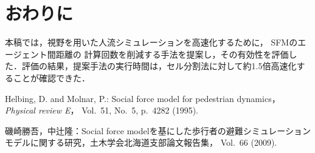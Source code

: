 \documentclass{maelab_y}
\newcommand{\分類条件}{
\begin{table}[t]
\begin{center}
\caption{進行方向を分類する条件}
\ecaption{Classification condition of moving direction $e_{i}$.}
\label{tb:hantei_jouken}
\begin{tabular}{c|c|c|c|c}
\hline \hline
			& 右 & 左 & 上 & 下 \\ \hline
パターン2   & $\frac{1}{\sqrt{2}} < e_x \leq 1  $
		    & $ -1 \leq e_x < \frac{-1}{\sqrt{2}}$ 
		    & $ \frac{-1}{\sqrt{2}} < e_x < \frac{1}{\sqrt{2}} $ 
		    & $ \frac{-1}{2} < e_x < \frac{1}{2} $ \\
パターン3   & $\frac{-1}{2} < e_y < \frac{1}{2} $ 
		    & $\frac{-1}{2} < e_y < \frac{1}{2} $
            & $ \frac{1}{\sqrt{2}} < e_y \leq 1$
		    & $ -1 \leq e_y < \frac{-1}{\sqrt{2}} $ \\
\hline
\multirow{2}{*}{パターン4}   
			& $R_x \geq A_x$ & $R_x < A_x$ & $R_y \geq A_y$ & $R_y < A_y $ \\
	        &  $L_x \geq A_x$ & $L_x < A_x$ & $L_y \geq A_y$ & $L_y < A_y$ \\
\hline
\multirow{2}{*}{パターン5}   
 			& $R_x \geq x_1$ & $R_x < x_2$ & $R_y \geq y_1$ & $R_y < y_2 $ \\
			& $L_x \geq x_1$ & $L_x < x_2$ & $L_y \geq y_1$ & $L_y < y_2 $ \\
\hline
パターン6   & $ \cos(\frac{1}{2}\theta_{view}) \leq  e_y $ 
			& $ e_y \leq -\cos(\frac{1}{2}\theta_{view})$ 
			& $ \sin(\frac{1}{2}(\pi - \theta_{view})) \leq e_x $ 
			& $ e_x \leq \sin(\frac{1}{2}(\pi - \theta_{view}))  $ \\
\hline
\end{tabular}
\end{center}
\end{table}}
\newcommand{\距離計算new}{
  \begin{table}[]
    \caption{エージェント間距離の計算回数[$10^{10}$回]}
    \label{tab:my-table}
    \begin{tabular}{c|llllll}
    \hline
    \multirow{2}{*}{人数}   & \multicolumn{6}{c}{パターン}                                                                                                                                                              \\ \cline{2-7} 
                          & \multicolumn{1}{c|}{1}    & \multicolumn{1}{c|}{2}               & \multicolumn{1}{c|}{3}      & \multicolumn{1}{c|}{4}      & \multicolumn{1}{c|}{5}      & \multicolumn{1}{c}{6}    \\ \hline
    \multirow{2}{*}{3000} & \multicolumn{1}{r|}{5.1}  & \multicolumn{1}{r|}{\textbf{3.9}}    & \multicolumn{1}{r|}{4.0}    & \multicolumn{1}{r|}{4.4}    & \multicolumn{1}{r|}{4.1}    & \multicolumn{1}{r}{4.4}  \\
                          & \multicolumn{1}{l|}{}     & \multicolumn{1}{l|}{\textbf{(24\%)}} & \multicolumn{1}{l|}{(23\%)} & \multicolumn{1}{l|}{(15\%)} & \multicolumn{1}{l|}{(21\%)} & (15\%)                   \\ \hline
    \multirow{2}{*}{5000} & \multicolumn{1}{r|}{14.4} & \multicolumn{1}{r|}{\textbf{10.9}}   & \multicolumn{1}{r|}{11.1}   & \multicolumn{1}{r|}{12.2}   & \multicolumn{1}{r|}{11.4}   & \multicolumn{1}{r}{12.2} \\
                          & \multicolumn{1}{l|}{}     & \multicolumn{1}{l|}{\textbf{(24\%)}} & \multicolumn{1}{l|}{(23\%)} & \multicolumn{1}{l|}{(15\%)} & \multicolumn{1}{l|}{(21\%)} & (15\%)                   \\ \hline
    \multirow{2}{*}{7500} & \multicolumn{1}{r|}{33.1} & \multicolumn{1}{r|}{\textbf{25.2}}   & \multicolumn{1}{r|}{25.8}   & \multicolumn{1}{r|}{28.3}   & \multicolumn{1}{r|}{26.7}   & \multicolumn{1}{r}{28.3} \\
                          & \multicolumn{1}{l|}{}     & \multicolumn{1}{l|}{\textbf{(24\%)}} & \multicolumn{1}{l|}{(22\%)} & \multicolumn{1}{l|}{(15\%)} & \multicolumn{1}{l|}{(20\%)} & (15\%)                   \\ \hline
    \end{tabular}
    \end{table}
}
\newcommand{\距離計算回数}{
\begin{table}[hbtp]
\begin{center}
\caption{エージェント間距離の計算回数[$10^{10}$回]}
\label{tb:count_result_yobi}
\begin{tabular}{c|r|r|r|r|r|r}
\hline \hline
	人数 & 1 & 2 & 3 & 4 & 5 & 6 \\  
	\hline
	\multirow{2}{*}{3000} 
	& 5.1   & $\mathbf{3.9}$   & 4.0    & 4.4    & 4.1    & 4.4   \\  
	&       & ($\mathbf{24.5}$\%) 					& (22.9\%) & (15.3\%) & (20.7\%) & (15.2\%) \\ \hline
	\multirow{2}{*}{5000} 
	& 14.4  &  $\mathbf{10.9}$  					  & 11.1   & 12.2   & 11.4   & 12.2  \\  
	&       & ($\mathbf{23.8}$\%) 					& (22.6\%) & (15.2\%) & (20.5\%) & (15.1\%) \\ \hline
	\multirow{2}{*}{7500} 
	& 33.1  & $\mathbf{25.2}$	 		    	 	 & 25.8   & 28.3   & 26.7   & 28.3  \\ 
	&       & ($\mathbf{23.9}$\%) 					& (22.2\%) & (14.6\%) & (19.4\%) & (14.6\%) \\ \hline
    \end{tabular}
  \end{center}
\end{table}}
\begin{document}
\section{おわりに}
本稿では，視野を用いた人流シミュレーションを高速化するために，
SFMのエージェント間距離の
計算回数を削減する手法を提案し，その有効性を評価した．評価の結果，提案手法の実行時間は，セル分割法に対して約1.5倍高速化することが確認できた．

\begin{thebibliography}{9}
\footnotesize
{}
  Helbing, D. and Molnar, P.: Social force model for pedestrian dynamics，{\em
    Physical review E}， Vol.~51, No.~5, p.\ 4282 (1995).

  磯崎勝吾，中辻隆：Social force
  modelを基にした歩行者の避難シミュレーションモデルに関する研究，土木学会北海道支部論文報告集，
  Vol.~66 (2009).
\end{thebibliography}
\end{document}
